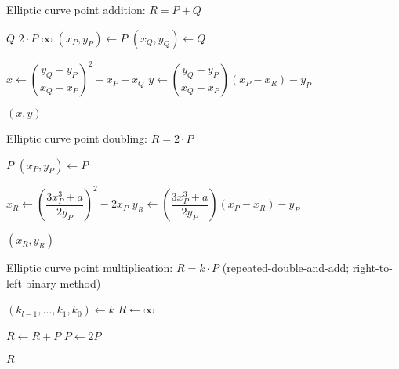 \begin{algorithm}
  \caption{Elliptic curve point addition: $R = P + Q$}
  \label{alg:ec_point_addition}

  \begin{algorithmic}[1]
        \Return $Q$
        \Return $2 \cdot P$
        \Return $\infty$
      \Else
        \State $(x_P, y_P) \gets P$
        \State $(x_Q, y_Q) \gets Q$
      \EndIf
      \medskip

      \State $x \gets \left(\dfrac{y_Q - y_P}{x_Q - x_P}\right)^2 - x_P - x_Q$ %
      \State $y \gets \left(\dfrac{y_Q - y_P}{x_Q - x_P}\right) (x_P - x_R) - y_P$ %

      \smallskip
      \Return $(x, y)$
    \EndFunction
  \end{algorithmic}
\end{algorithm}

\begin{algorithm}
  \caption{Elliptic curve point doubling: $R = 2 \cdot P$}
  \label{alg:ec_point_doubling}

  \begin{algorithmic}[1]
        \Return $P$
      \Else
        \State $(x_P, y_P) \gets P$
      \EndIf
      \medskip

      \State $x_R \gets \left(\dfrac{3 x_P^3 + a}{2 y_P}\right)^2 - 2 x_P$ %
      \State $y_R \gets \left(\dfrac{3 x_P^3 + a}{2 y_P}\right) (x_P - x_R) - y_P$ %

      \smallskip
      \Return $(x_R, y_R)$
    \EndFunction
  \end{algorithmic}
\end{algorithm}

\begin{algorithm}
  \caption{Elliptic curve point multiplication: $R = k \cdot P$ (repeated-double-and-add; right-to-left binary method)}
  \label{alg:ec_point_multiplication}

  \begin{algorithmic}[1]
      \State $(k_{l-1}, \dots, k_1, k_0) \gets k$ 
      \State $R \gets \infty$

          \State $R \gets R + P$
        \EndIf
        \State $P \gets 2P$
      \EndFor

      \smallskip
      \Return $R$
    \EndFunction
  \end{algorithmic}
\end{algorithm}

